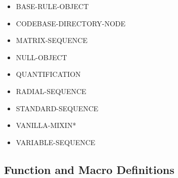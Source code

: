 \documentclass [11pt]{book}
\begin{document}
\begin{itemize}

\item {}BASE-RULE-OBJECT

\item {}CODEBASE-DIRECTORY-NODE

\item {}MATRIX-SEQUENCE

\item {}NULL-OBJECT

\item {}QUANTIFICATION

\item {}RADIAL-SEQUENCE

\item {}STANDARD-SEQUENCE

\item {}VANILLA-MIXIN*

\item {}VARIABLE-SEQUENCE

\end{itemize}



\subsection{Function and Macro Definitions}

\label{subsec:functionandmacrodefinitions}
\end{document}
